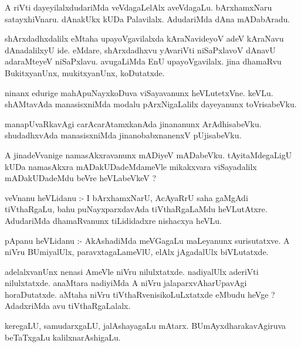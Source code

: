 \documentclass{article}
\begin{document}
\begin{mn}
A riVti dayeyilalxdudariMda veVdagaLelAlx  aveVdagaLu.  bArxhamxNaru satayxhiVnaru.  
dAnakUkx kUDa Palavilalx.  AdudariMda dAna mADabAradu.
\end{mn}

\begin{mn}
shArxdadhxdalilx eMtaha  upayoVgavilalxda  kAraNavideyoV  adeV kAraNavu dAnadalilxyU ide.  
eMdare,  shArxdadhxvu yAvariVti  niSaPxlavoV dAnavU adaraMteyeV niSaPxlavu.  
avugaLiMda EnU upayoVgavilalx.  jina dhamaRvu BukitxyanUnx, mukitxyanUnx, koDutatxde.
\end{mn}

\begin{mn}
ninanx edurige mahApuNayxkoDuva  viSayavanunx heVLutetxVne. keVLu.  shAMtavAda 
manasisxniMda modalu pArxNigaLalilx dayeyanunx toVrisabeVku.
\end{mn}

\begin{mn}
manapUvaRkavAgi carAcarAtamxkanAda  jinananunx  ArAdhisabeVku.  shudadhxvAda 
 manasisxniMda jinanobabxnanenxV pUjisabeVku.
\end{mn}

\begin{mn}
A jinadeVvanige namasAkxravanunx mADiyeV mADabeVku. tAyitaMdegaLigU kUDa namasAkxra 
mADakUDadeMdameVle mikakxvara viSayadalilx mADakUDadeMdu beVre heVLabeVkeV ?
\end{mn}

\begin{mn}
veVnanu heVLidanu :- I bArxhamxNarU,  AcAyaRrU saha gaMgAdi tiVthaRgaLu, bahu 
puNayxparxdavAda tiVthaRgaLaMdu heVLutAtxre. AdudariMda dhamaRvanunx tiLididadxre nishacxya heVLu.
\end{mn}

\begin{mn}
pApanu heVLidanu :- AkAshadiMda meVGagaLu maLeyanunx surisutatxve.  A niVru 
BUmiyalUlx, paravxtagaLameVlU, elAlx jAgadalUlx biVLutatxde.
\end{mn}

\begin{mn}
adelalxvanUnx nenasi AmeVle niVru nilulxtatxde. nadiyalUlx aderiVti nilulxtatxde.  
anaMtara nadiyiMda A niVru jalaparxvAharUpavAgi horaDutatxde.  aMtaha niVru 
tiVthaRvenisikoLuLxtatxde eMbudu heVge ? AdadxriMda avu tiVthaRgaLalalx.
\end{mn}

\begin{mn}
keregaLU, samudarxgaLU, jalAshayagaLu mAtarx.  BUmAyxdharakavAgiruva beTaTxgaLu kalilxnarAshigaLu.
\end{mn}
\end{document}
